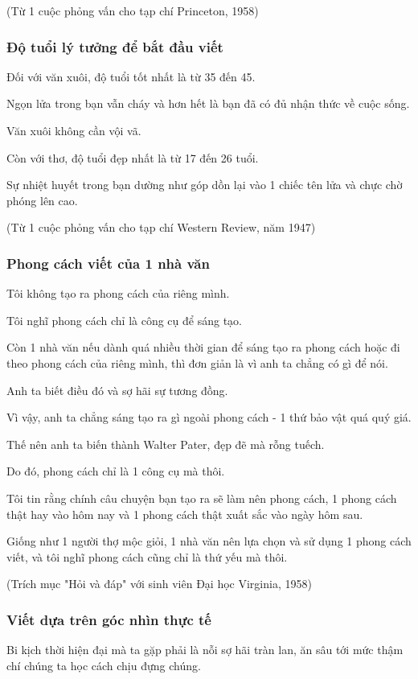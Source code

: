 \documentclass{article}
\begin{document}
(Từ 1 cuộc phỏng vấn cho tạp chí Princeton, 1958)

\subsubsection{Độ tuổi lý tưởng để bắt đầu viết}
Đối với văn xuôi, độ tuổi tốt nhất là từ 35 đến 45.

Ngọn lửa trong bạn vẫn cháy và hơn hết là bạn đã có đủ nhận thức về cuộc sống.

Văn xuôi không cần vội vã.

Còn với thơ, độ tuổi đẹp nhất là từ 17 đến 26 tuổi.

Sự nhiệt huyết trong bạn dường như góp dồn lại vào 1 chiếc tên lửa và chực chờ phóng lên cao.

(Từ 1 cuộc phỏng vấn cho tạp chí Western Review, năm 1947)

\subsubsection{Phong cách viết của 1 nhà văn}
Tôi không tạo ra phong cách của riêng mình.

Tôi nghĩ phong cách chỉ là công cụ để sáng tạo.

Còn 1 nhà văn nếu dành quá nhiều thời gian để sáng tạo ra phong cách hoặc đi theo phong cách của riêng mình, thì đơn giản là vì anh ta chẳng có gì để nói.

Anh ta biết điều đó và sợ hãi sự tương đồng.

Vì vậy, anh ta chẳng sáng tạo ra gì ngoài phong cách - 1 thứ bảo vật quá quý giá.

Thế nên anh ta biến thành Walter Pater, đẹp đẽ mà rỗng tuếch.

Do đó, phong cách chỉ là 1 công cụ mà thôi.

Tôi tin rằng chính câu chuyện bạn tạo ra sẽ làm nên phong cách, 1 phong cách thật hay vào hôm nay và 1 phong cách thật xuất sắc vào ngày hôm sau.

Giống như 1 người thợ mộc giỏi, 1 nhà văn nên lựa chọn và sử dụng 1 phong cách viết, và tôi nghĩ phong cách cũng chỉ là thứ yếu mà thôi.

(Trích mục "Hỏi và đáp" với sinh viên Đại học Virginia, 1958)

\subsubsection{Viết dựa trên góc nhìn thực tế}

Bi kịch thời hiện đại mà ta gặp phải là nỗi sợ hãi tràn lan, ăn sâu tới mức thậm chí chúng ta học cách chịu đựng chúng.
\end{document}
